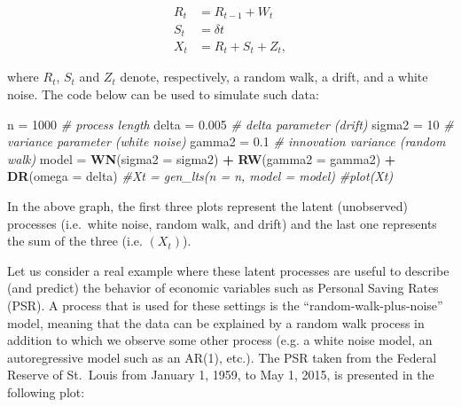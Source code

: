 \documentclass[]{book}
\newenvironment{Shaded}{\begin{snugshade}}{\end{snugshade}}
\newcommand{\CommentTok}[1]{\textcolor[rgb]{0.56,0.35,0.01}{\textit{#1}}}
\newcommand{\DataTypeTok}[1]{\textcolor[rgb]{0.13,0.29,0.53}{#1}}
\newcommand{\DecValTok}[1]{\textcolor[rgb]{0.00,0.00,0.81}{#1}}
\newcommand{\FloatTok}[1]{\textcolor[rgb]{0.00,0.00,0.81}{#1}}
\newcommand{\KeywordTok}[1]{\textcolor[rgb]{0.13,0.29,0.53}{\textbf{#1}}}
\newcommand{\NormalTok}[1]{#1}
\newcommand{\OperatorTok}[1]{\textcolor[rgb]{0.81,0.36,0.00}{\textbf{#1}}}
\newcommand{\StringTok}[1]{\textcolor[rgb]{0.31,0.60,0.02}{#1}}
\theoremstyle{definition}
\theoremstyle{definition}
\theoremstyle{definition}
\theoremstyle{remark}
\begin{document}
\[\begin{aligned}
R_t &= R_{t-1} + W_t \\
S_t &= \delta t \\
X_t &= R_t + S_t + Z_t,
\end{aligned}\]

where \(R_t\), \(S_t\) and \(Z_t\) denote, respectively, a random walk,
a drift, and a white noise. The code below can be used to simulate such
data:

\begin{Shaded}
\begin{Highlighting}[]
\NormalTok{n =}\StringTok{ }\DecValTok{1000}                                \CommentTok{# process length}
\NormalTok{delta =}\StringTok{ }\FloatTok{0.005}                           \CommentTok{# delta parameter (drift)}
\NormalTok{sigma2 =}\StringTok{ }\DecValTok{10}                             \CommentTok{# variance parameter (white noise)}
\NormalTok{gamma2 =}\StringTok{ }\FloatTok{0.1}                            \CommentTok{# innovation variance (random walk)}
\NormalTok{model =}\StringTok{ }\KeywordTok{WN}\NormalTok{(}\DataTypeTok{sigma2 =}\NormalTok{ sigma2) }\OperatorTok{+}\StringTok{ }\KeywordTok{RW}\NormalTok{(}\DataTypeTok{gamma2 =}\NormalTok{ gamma2) }\OperatorTok{+}\StringTok{ }\KeywordTok{DR}\NormalTok{(}\DataTypeTok{omega =}\NormalTok{ delta)}
\CommentTok{#Xt = gen_lts(n = n, model = model)}
\CommentTok{#plot(Xt)}
\end{Highlighting}
\end{Shaded}

In the above graph, the first three plots represent the latent
(unobserved) processes (i.e.~white noise, random walk, and drift) and
the last one represents the sum of the three (i.e. \((X_t)\)).

Let us consider a real example where these latent processes are useful
to describe (and predict) the behavior of economic variables such as
Personal Saving Rates (PSR). A process that is used for these settings
is the ``random-walk-plus-noise'' model, meaning that the data can be
explained by a random walk process in addition to which we observe some
other process (e.g. a white noise model, an autoregressive model such as
an AR(1), etc.). The PSR taken from the Federal Reserve of St.~Louis
from January 1, 1959, to May 1, 2015, is presented in the following
plot:

\begin{Shaded}
\end{Shaded}
\end{document}

